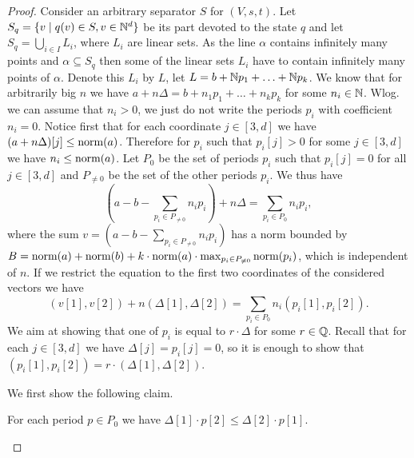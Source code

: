 \begin{proof}
Consider an arbitrary separator $S$ for $(V, s, t)$. Let $S_q = \{v \mid q(v) \in S, v \in \mathbb{N}^d\}$
be its part devoted to the state $q$ and let $S_q = \bigcup_{i \in I} L_i$,
where $L_i$ are linear sets. As the line $\alpha$ contains infinitely many points
and $\alpha \subseteq S_q$ then some of the linear sets $L_i$ have to contain infinitely many points of $\alpha$.
Denote this $L_i$ by $L$, let $L = b + \mathbb{N} p_1 + \ldots + \mathbb{N} p_k$.
We know that for arbitrarily big $n$ we have $a + n\Delta = b + n_1 p_1 + \ldots + n_k p_k$ for some $n_i \in \mathbb{N}$.
Wlog. we can assume that $n_i > 0$, we just do not write the periods $p_i$ with coefficient $n_i = 0$.
Notice first that for each coordinate $j \in [3,d]$ we have $(a + n\Delta)[j] \leq \textup{norm}(a)$.
Therefore for $p_i$ such that $p_i[j] > 0$ for some $j \in [3,d]$ we have $n_i \leq \textup{norm}(a)$.
Let $P_0$ be the set of periods $p_i$ such that $p_i[j] = 0$ for all $j \in [3,d]$ and
$P_{\neq 0}$ be the set of the other periods $p_i$.
We thus have
\[
(a - b - \sum_{p_i \in P_{\neq 0}} n_i p_i) + n\Delta = \sum_{p_i \in P_0} n_i p_i,
\]
where the sum $v = (a - b - \sum_{p_i \in P_{\neq 0}} n_i p_i)$ has a norm bounded by
$B = \textup{norm}(a) + \textup{norm}(b) + k \cdot \textup{norm}(a) \cdot \max_{p_i \in P_{\neq 0}} \textup{norm}(p_i)$,
which is independent of $n$. If we restrict the equation to the first two coordinates of the considered vectors we have
\begin{equation}\label{eq:pzero}
(v[1], v[2]) + n (\Delta[1], \Delta[2]) = \sum_{p_i \in P_0} n_i (p_i[1], p_i[2]).
\end{equation}
We aim at showing that one of $p_i$ is equal to $r \cdot \Delta$ for some $r \in \mathbb{Q}$. Recall that for each $j \in [3,d]$
we have $\Delta[j] = p_i[j] = 0$, so it is enough to show that $(p_i[1], p_i[2]) = r \cdot (\Delta[1], \Delta[2])$.

We first show the following claim.

\begin{claim}\label{cl:ratio}
For each period $p \in P_0$ we have $\Delta[1] \cdot p[2] \leq \Delta[2] \cdot p[1]$.
\end{claim}


\end{proof}
